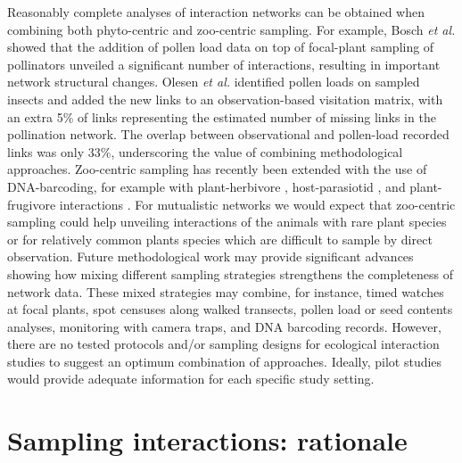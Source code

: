\documentclass[12pt]{article}
\begin{document}
Reasonably complete analyses of interaction networks can be obtained when combining both phyto-centric and zoo-centric sampling. For example, Bosch \emph{et al.} \citeyearpar{Bosch:2009jga} showed that the addition of pollen load data on top of focal-plant sampling of pollinators unveiled a significant number of interactions, resulting in important network structural changes. Olesen \emph{et al.}\citeyearpar[][]{Olesen:2011a} identified pollen loads on sampled insects and added the new links to an observation-based visitation matrix, with an extra 5\% of links representing the estimated number of missing links in the pollination network. The overlap between observational and pollen-load recorded links was only 33\%, underscoring the value of combining methodological approaches. Zoo-centric sampling has recently been extended with the use of DNA-barcoding, for example with plant-herbivore \citep{JuradoRivera:2009cp}, host-parasiotid \citep{Wirta:2014aa,Evans:2016aa}, and plant-frugivore interactions \citep{GonzalezVaro:2014ij}. For mutualistic networks we would expect that zoo-centric sampling could help unveiling interactions of the animals with rare plant species or for relatively common plants species which are difficult to sample by direct observation. Future methodological work may provide significant advances showing how mixing different sampling strategies strengthens the completeness of network data. These mixed strategies may combine, for instance, timed watches at focal plants, spot censuses along walked transects, pollen load or seed contents analyses, monitoring with camera traps, and DNA barcoding records. However, there are no tested protocols and\slash or sampling designs for ecological interaction studies to suggest an optimum combination of approaches. Ideally, pilot studies would provide adequate information for each specific study setting.

\section*{Sampling interactions: rationale}
\label{samplinginteractions:rationale}
\end{document}
